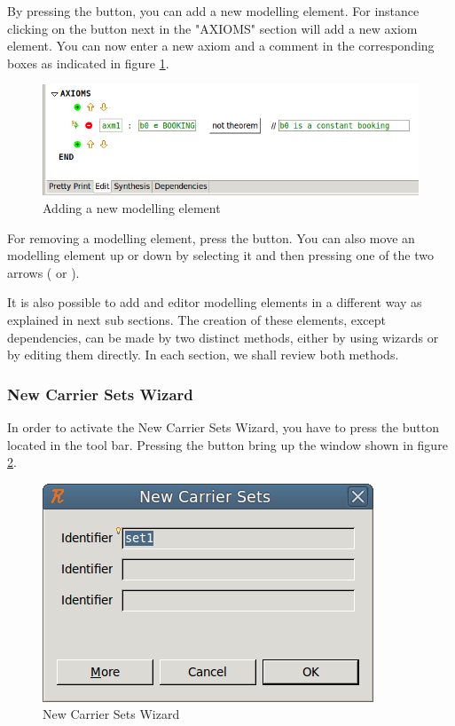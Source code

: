 By pressing the  button, you can add a new modelling element. For instance clicking on the  button next in the "AXIOMS" section will add a new axiom element. You can now enter a new axiom and a comment in the corresponding boxes as indicated in figure \ref{fig_ref_01_eventb_editor3}.

\begin{figure}[!h]
\begin{center}
	\includegraphics{img/reference/ref_01_eventb_editor3.png}
	\caption{Adding a new modelling element}
	\label{fig_ref_01_eventb_editor3}
\end{center}
\end{figure}

For removing a modelling element, press the  button. You can also move an modelling element up or down by selecting it and then pressing one of the two arrows ( or ).

It is also possible to add and editor modelling elements in a different way as explained in next sub sections. The creation of these elements, except dependencies, can be made by two distinct methods, either by using wizards or by editing them directly. In each section, we shall review both methods.

\subsubsection{New Carrier Sets Wizard}

In order to activate the \textsf{New Carrier Sets Wizard}, you have to press the  button located in the tool bar. Pressing the button bring up the window shown in figure \ref{fig_ref_01_eventb_editor4}.

\begin{figure}[!h]
\begin{center}
	\includegraphics{img/reference/ref_01_eventb_editor4.png}
	\caption{New Carrier Sets Wizard}
	\label{fig_ref_01_eventb_editor4}
\end{center}
\end{figure}

